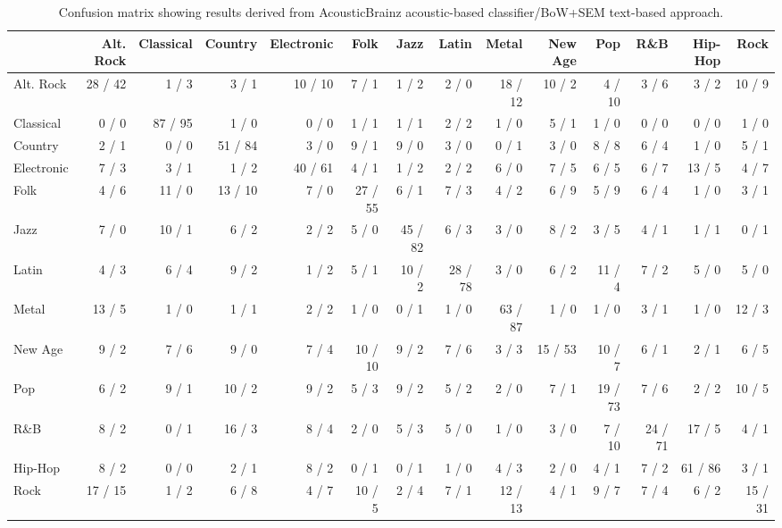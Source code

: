 \begin{table}[]
\centering
\scriptsize
\begin{tabular}{|l|r|r|r|r|r|r|r|r|r|r|r|r|r|}
\hline
& Alt. Rock & Classical & Country & Electronic & Folk & Jazz & Latin & Metal & New Age & Pop & R\&B & Hip-Hop & Rock  \\
\hline
Alt. Rock & 28 / 42 & 1 / 3 & 3 / 1 & 10 / 10 & 7 / 1 & 1 / 2 & 2 / 0 & 18 / 12 & 10 / 2 & 4 / 10 & 3 / 6 & 3 / 2 & 10 / 9 \\
Classical & 0 / 0 & 87 / 95 & 1 / 0 & 0 / 0 & 1 / 1 & 1 / 1 & 2 / 2 & 1 / 0 & 5 / 1 & 1 / 0 & 0 / 0 & 0 / 0 & 1 / 0 \\
Country & 2 / 1 & 0 / 0 & 51 / 84 & 3 / 0 & 9 / 1 & 9 / 0 & 3 / 0 & 0 / 1 & 3 / 0 & 8 / 8 & 6 / 4 & 1 / 0 & 5 / 1 \\
Electronic & 7 / 3 & 3 / 1 & 1 / 2 & 40 / 61 & 4 / 1 & 1 / 2 & 2 / 2 & 6 / 0 & 7 / 5 & 6 / 5 & 6 / 7 & 13 / 5 & 4 / 7 \\
Folk & 4 / 6 & 11 / 0 & 13 / 10 & 7 / 0 & 27 / 55 & 6 / 1 & 7 / 3 & 4 / 2 & 6 / 9 & 5 / 9 & 6 / 4 & 1 / 0 & 3 / 1 \\
Jazz & 7 / 0 & 10 / 1 & 6 / 2 & 2 / 2 & 5 / 0 & 45 / 82 & 6 / 3 & 3 / 0 & 8 / 2 & 3 / 5 & 4 / 1 & 1 / 1 & 0 / 1 \\
Latin & 4 / 3 & 6 / 4 & 9 / 2 & 1 / 2 & 5 / 1 & 10 / 2 & 28 / 78 & 3 / 0 & 6 / 2 & 11 / 4 & 7 / 2 & 5 / 0 & 5 / 0 \\
Metal & 13 / 5 & 1 / 0 & 1 / 1 & 2 / 2 & 1 / 0 & 0 / 1 & 1 / 0 & 63 / 87 & 1 / 0 & 1 / 0 & 3 / 1 & 1 / 0 & 12 / 3 \\
New Age & 9 / 2 & 7 / 6 & 9 / 0 & 7 / 4 & 10 / 10 & 9 / 2 & 7 / 6 & 3 / 3 & 15 / 53 & 10 / 7 & 6 / 1 & 2 / 1 & 6 / 5 \\
Pop & 6 / 2 & 9 / 1 & 10 / 2 & 9 / 2 & 5 / 3 & 9 / 2 & 5 / 2 & 2 / 0 & 7 / 1 & 19 / 73 & 7 / 6 & 2 / 2 & 10 / 5 \\
R\&B & 8 / 2 & 0 / 1 & 16 / 3 & 8 / 4 & 2 / 0 & 5 / 3 & 5 / 0 & 1 / 0 & 3 / 0 & 7 / 10 & 24 / 71 & 17 / 5 & 4 / 1 \\
Hip-Hop & 8 / 2 & 0 / 0 & 2 / 1 & 8 / 2 & 0 / 1 & 0 / 1 & 1 / 0 & 4 / 3 & 2 / 0 & 4 / 1 & 7 / 2 & 61 / 86 & 3 / 1 \\
Rock & 17 / 15 & 1 / 2 & 6 / 8 & 4 / 7 & 10 / 5 & 2 / 4 & 7 / 1 & 12 / 13 & 4 / 1 & 9 / 7 & 7 / 4 & 6 / 2 & 15 / 31 \\
\hline
\end{tabular}
\caption{Confusion matrix showing results derived from AcousticBrainz acoustic-based classifier/BoW+SEM text-based approach.}
\label{tbl:similarity:confusion}
\end{table}


